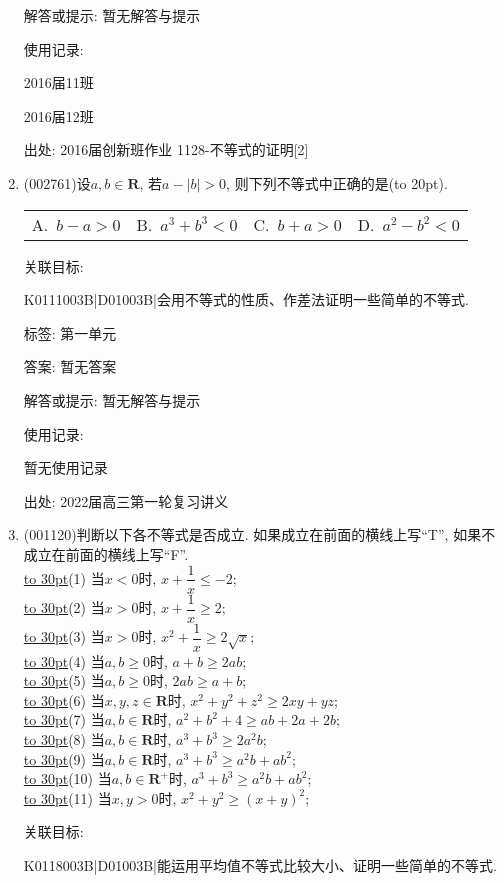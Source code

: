 \documentclass[10pt,a4paper]{article}
\newcommand{\blank}[1]{\underline{\hbox to #1pt{}}}
\newcommand{\bracket}[1]{(\hbox to #1pt{})}
\newcommand{\fourch}[4]{\par\begin{tabular}{p{.23\textwidth}p{.23\textwidth}p{.23\textwidth}p{.23\textwidth}}
A.~#1 &B.~#2& C.~#3& D.~#4
\end{tabular}}
\begin{document}
\begin{enumerate}[1.]
解答或提示: 暂无解答与提示

使用记录:

2016届11班		

2016届12班		


出处: 2016届创新班作业	1128-不等式的证明[2]
\item { (002761)}设$a,b\in \mathbf{R}$, 若$a-|b|>0$, 则下列不等式中正确的是\bracket{20}.
\fourch{$b-a>0$}{$a^3+b^3<0$}{$b+a>0$}{$a^2-b^2<0$}


关联目标:

K0111003B|D01003B|会用不等式的性质、作差法证明一些简单的不等式.



标签: 第一单元

答案: 暂无答案

解答或提示: 暂无解答与提示

使用记录:

暂无使用记录


出处: 2022届高三第一轮复习讲义
\item { (001120)}判断以下各不等式是否成立. 如果成立在前面的横线上写``T'', 如果不成立在前面的横线上写``F''.\\ 
\blank{30}(1) 当$x<0$时, $x+\dfrac{1}{x}\le -2$;\\ 
\blank{30}(2) 当$x>0$时, $x+\dfrac{1}{x}\ge 2$;\\ 
\blank{30}(3) 当$x>0$时, $x^2+\dfrac{1}{x}\ge 2\sqrt{x}$;\\ 
\blank{30}(4) 当$a,b\ge 0$时, $a+b\ge 2ab$;\\ 
\blank{30}(5) 当$a,b\ge 0$时, $2ab\ge a+b$;\\ 
\blank{30}(6) 当$x,y,z\in \mathbf{R}$时, $x^2+y^2+z^2\ge 2xy+yz$;\\ 
\blank{30}(7) 当$a,b\in \mathbf{R}$时, $a^2+b^2+4\ge ab+2a+2b$;\\ 
\blank{30}(8) 当$a,b\in \mathbf{R}$时, $a^3+b^3\ge 2a^2b$;\\ 
\blank{30}(9) 当$a,b \in \mathbf{R}$时, $a^3+b^3\ge a^2b+ab^2$;\\ 
\blank{30}(10) 当$a,b\in \mathbf{R}^+$时, $a^3+b^3\ge a^2b+ab^2$;\\ 
\blank{30}(11) 当$x,y>0$时, $x^2+y^2\ge (x+y)^2$;


关联目标:

K0118003B|D01003B|能运用平均值不等式比较大小、证明一些简单的不等式.


\end{enumerate}
\end{document}
